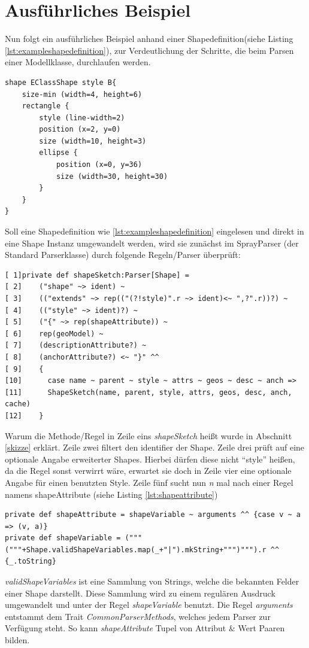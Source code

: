 \section{Ausführliches Beispiel}\label{example}
Nun folgt ein ausführliches Beispiel anhand einer Shapedefinition(siehe Listing \ref{lst:exampleshapedefinition}), zur Verdeutlichung der Schritte, die beim Parsen einer Modellklasse, durchlaufen werden.
\begin{lstlisting}[style=spray, caption = {Beispieldefinition für eine Shape}, label = {lst:exampleshapedefinition}]
shape EClassShape style B{
    size-min (width=4, height=6)
    rectangle {
        style (line-width=2)
        position (x=2, y=0)
        size (width=10, height=3)
        ellipse {
            position (x=0, y=36)
            size (width=30, height=30)
        }
    }
}
\end{lstlisting}Soll eine Shapedefinition wie \ref{lst:exampleshapedefinition} eingelesen und direkt in eine Shape Instanz umgewandelt werden, wird sie zunächst im SprayParser (der Standard Parserklasse) durch folgende Regeln/Parser überprüft:
\begin{lstlisting}[style=scala, caption = {Auszug aus Code Methode zum Parsen einer Shape(Sketch)}, label = {lst:defshapesketch}]
[ 1]private def shapeSketch:Parser[Shape] =
[ 2]    ("shape" ~> ident) ~
[ 3]    (("extends" ~> rep(("(?!style)".r ~> ident)<~ ",?".r))?) ~
[ 4]    (("style" ~> ident)?) ~
[ 5]    ("{" ~> rep(shapeAttribute)) ~
[ 6]    rep(geoModel) ~
[ 7]    (descriptionAttribute?) ~
[ 8]    (anchorAttribute?) <~ "}" ^^
[ 9]    {
[10]      case name ~ parent ~ style ~ attrs ~ geos ~ desc ~ anch =>
[11]      ShapeSketch(name, parent, style, attrs, geos, desc, anch, cache) 
[12]    }
\end{lstlisting}Warum die Methode/Regel in Zeile eins \textit{shapeSketch} heißt wurde in Abschnitt \ref{skizze} erklärt. Zeile zwei filtert den identifier der Shape. Zeile drei prüft auf eine optionale Angabe erweiterter Shapes. Hierbei dürfen diese nicht "`style"' heißen, da die Regel sonst verwirrt wäre, erwartet sie doch in Zeile vier eine optionale Angabe für einen benutzten Style. Zeile fünf sucht nun \textit{n} mal nach einer Regel namens shapeAttribute (siehe Listing \ref{lst:shapeattribute})
\begin{lstlisting}[style=scala, caption = {Auszug aus Code Regeln zum Parsen der Felder}, label = {lst:shapeattribute}]
private def shapeAttribute = shapeVariable ~ arguments ^^ {case v ~ a => (v, a)}
private def shapeVariable = ("""("""+Shape.validShapeVariables.map(_+"|").mkString+""")""").r ^^ {_.toString}
\end{lstlisting}\textit{validShapeVariables} ist eine Sammlung von Strings, welche die bekannten Felder einer Shape darstellt. Diese Sammlung wird zu einem regulären Ausdruck umgewandelt und unter der Regel \textit{shapeVariable} benutzt. Die Regel \textit{arguments} entstammt dem Trait \textit{CommonParserMethods}, welches jedem Parser zur Verfügung steht. So kann \textit{shapeAttribute} Tupel von Attribut \& Wert Paaren bilden. 
